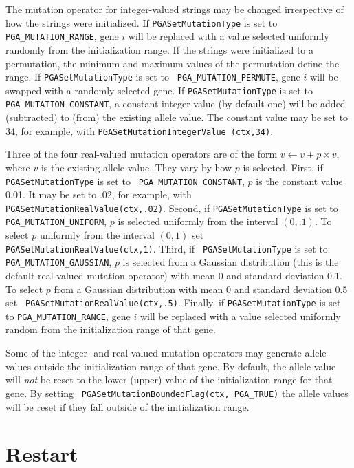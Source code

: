 \documentclass{report}
\begin{document}
The mutation operator for integer-valued strings may be changed irrespective
of how the strings were initialized.  If {\tt PGASetMutationType} is set to
{\tt PGA\_MUTATION\_RANGE}, gene $i$ will be replaced with a value selected
uniformly randomly from the initialization range.  If the strings were
initialized to a permutation, the minimum and maximum values of the
permutation define the range.  If {\tt PGASetMutationType} is set to {\tt
PGA\_MUTATION\_PERMUTE}, gene $i$ will be swapped with a randomly selected
gene.  If {\tt PGASetMutationType} is set to {\tt PGA\_MUTATION\_CONSTANT}, a
constant integer value (by default one) will be added (subtracted) to (from)
the existing allele value.  The constant value may be set to 34, for example,
with {\tt PGASetMutationIntegerValue (ctx,34)}.

Three of the four real-valued mutation operators are of the form $v \leftarrow
v \pm p \times v$, where $v$ is the existing allele value.  They vary by how
$p$ is selected.  First, if {\tt PGASetMutationType} is set to {\tt
PGA\_MUTATION\_CONSTANT}, $p$ is the constant value 0.01. It may be set to
.02, for example, with {\tt PGASetMutationRealValue(ctx,.02)}.  Second, if
{\tt PGASetMutationType} is set to {\tt PGA\_MUTATION\_UNIFORM}, $p$ is
selected uniformly from the interval $(0,.1)$. To select $p$ uniformly from
the interval $(0,1)$ set {\tt PGASetMutationRealValue(ctx,1)}.  Third, if {\tt
PGASetMutationType} is set to {\tt PGA\_MUTATION\_GAUSSIAN}, $p$ is selected
from a Gaussian distribution (this is the default real-valued mutation
operator) with mean 0 and standard deviation 0.1.  To select $p$ from a
Gaussian distribution with mean 0 and standard deviation 0.5 set {\tt
PGASetMutationRealValue(ctx,.5)}.  Finally, if {\tt PGASetMutationType} is set
to {\tt PGA\_MUTATION\_RANGE}, gene $i$ will be replaced with a value selected
uniformly random from the initialization range of that gene.


Some of the integer- and real-valued mutation operators may generate allele
values outside the initialization range of that gene.  By
default, the allele value will \textit{not} be reset to the lower
(upper) value of the
initialization range for that gene.  By setting {\tt
PGASetMutationBoundedFlag(ctx, PGA\_TRUE)} the allele values will
be reset if they fall outside of the initialization range.


\section{Restart}\label{sec:restart}
\end{document}
